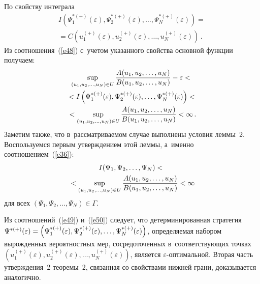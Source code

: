 \begin{multicols}{2}
По свойству интеграла
\begin{multline}
I\left(\Psi_1^{*(+)}(\varepsilon), \Psi_2^{*(+)}(\varepsilon),\ldots,
 \Psi_N^{*(+)}(\varepsilon)\right)={}\\
 {}=
 C\left(u_1^{(+)}(\varepsilon), u_2^{(+)}(\varepsilon),\ldots, 
 u_N^{(+)}(\varepsilon)\right)\,. 
 \label{e48}
\end{multline}
Из соотношения~(\ref{e48}) с~учетом указанного свойства основной функции получаем:
\begin{multline}
\sup\limits_{(u_1, u_2,\ldots, u_N)\in U} \displaystyle\frac{\displaystyle A(u_1, u_2,\ldots, u_N)\mathstrut}{\displaystyle B(u_1, u_2,\ldots, u_N)\mathstrut}-\varepsilon<{}\\
{}< I\left(\Psi_1^{*(+)}(\varepsilon), 
\Psi_2^{*(+)}(\varepsilon),\ldots, \Psi_N^{*(+)}(\varepsilon)\right)<{}
\\
{}< \sup\limits_{(u_1, u_2,\ldots, u_N)\in U} \displaystyle\frac{\displaystyle A(u_1, u_2,\ldots, u_N)\mathstrut}{\displaystyle B(u_1, u_2,\ldots, u_N)\mathstrut}<\infty\,. 
\label{e49}
\end{multline}
Заметим также, что в~рассматриваемом случае выполнены условия леммы~2. 
Воспользуемся первым утверждением этой леммы, а~именно соотношением~(\ref{e36}):
\begin{multline}
I(\Psi_1, \Psi_2,\ldots, \Psi_N)< {}\\
{}<\sup\limits_{(u_1, u_2,\ldots, u_N)
\in U} \displaystyle\frac{\displaystyle A(u_1, u_2,\ldots, u_N)\mathstrut}{\displaystyle B(u_1, u_2,\ldots, u_N)\mathstrut}<\infty 
\label{e50}
\end{multline}
для всех $(\Psi_1, \Psi_2,\ldots, \Psi_N)\in\Gamma$.

Из соотношений~(\ref{e49}) и~(\ref{e50}) следует, что детерминированная стратегия 
$\Psi^{*(+)}(\varepsilon)\hm=\left(\Psi_1^{*(+)}(\varepsilon), \Psi_2^{*(+)}(\varepsilon),
\ldots, \Psi_N^{*(+)}(\varepsilon)\right)$, опре\-де\-ля\-емая набором вырожденных 
вероятностных мер, сосредоточенных в~соответствующих точках 
$\left(u_1^{(+)}(\varepsilon), u_2^{(+)}(\varepsilon),\ldots, 
u_N^{(+)}(\varepsilon)\right)$, является $\varepsilon$-оп\-ти\-маль\-ной. 
Вторая часть утверждения~2 теоремы~2, связанная со свойствами нижней грани, 
доказывается аналогично.


\end{multicols}
